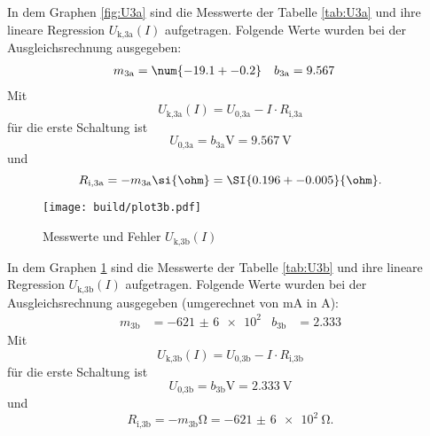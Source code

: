   In dem Graphen \ref{fig:U3a} sind die Messwerte der Tabelle
  \ref{tab:U3a} und ihre lineare Regression
  $U_\text{k,3a}(I)$ aufgetragen.
  Folgende Werte wurden bei der Ausgleichsrechnung ausgegeben:
  \begin{align}
    m_\text{3a} & = \num{-19.1 +- 0.2} & b_\text{3a} & = 9.567
  \end{align}
  Mit
  \begin{equation}
    U_\text{k,3a}(I) = U_\text{0,3a} - I \cdot R_\text{i,3a}
  \end{equation}
  für die erste Schaltung ist
  \begin{equation}
    U_\text{0,3a} = b_\text{3a} \si{\V} = \SI{9.567}{\V}
  \end{equation}
  und
  \begin{equation}
    R_\text{i,3a} = -m_\text{3a} \si{\ohm} = \SI{0.196 +- 0.005}{\ohm}.
  \end{equation}

  \begin{figure}[h]
    \texttt{[image: build/plot3b.pdf]}
    \caption{Messwerte und Fehler $U_\text{k,3b}(I)$}
    \label{fig:U3b}
  \end{figure}

  In dem Graphen \ref{fig:U3b} sind die Messwerte der Tabelle
  \ref{tab:U3b} und ihre lineare Regression
  $U_\text{k,3b}(I)$ aufgetragen.
  Folgende Werte wurden bei der Ausgleichsrechnung ausgegeben (umgerechnet von
  \si{\milli\A} in \si{\A}):
  \begin{align}
    m_\text{3b} & = \num{-621(6)e2} & b_\text{3b} & = 2.333
  \end{align}
  Mit
  \begin{equation}
    U_\text{k,3b}(I) = U_\text{0,3b} - I \cdot R_\text{i,3b}
  \end{equation}
  für die erste Schaltung ist
  \begin{equation}
    U_\text{0,3b} = b_\text{3b} \si{\V} = \SI{2.333}{\V}
  \end{equation}
  und
  \begin{equation}
    R_\text{i,3b} = -m_\text{3b} \si{\ohm} = \SI{-621(6)e2}{\ohm}.
  \end{equation}

